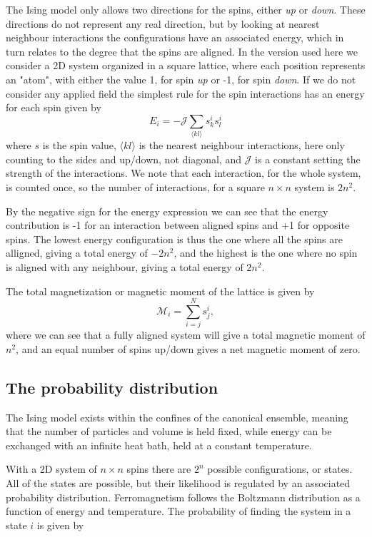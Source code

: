 \documentclass[a4paper]{article}
\begin{document}
The Ising model only allows two directions for the spins, either \textit{up} or \textit{down}. These directions do not represent any real direction, but by looking at nearest neighbour interactions the configurations have an associated energy, which in turn relates to the degree that the spins are aligned. In the version used here we consider a 2D system organized in a square lattice, where each position represents an "atom", with either the value 1, for spin \textit{up} or -1, for spin \textit{down}. If we do not consider any applied field the simplest rule for the spin interactions has an energy for each spin given by 
\begin{equation}
	E_i=-\mathcal{J}\sum_{\langle kl \rangle}s_k^is_l^i \label{eq:E1}
\end{equation}
where $s$ is the spin value, $\langle kl \rangle$ is the nearest neighbour interactions, here only counting to the sides and up/down, not diagonal, and $\mathcal{J}$ is a constant setting the strength of the interactions. We note that each interaction, for the whole system, is counted once, so the number of interactions, for a square $n\times n$ system is $2n^2$.

By the negative sign for the energy expression we can see that the energy contribution is -1 for an interaction between aligned spins and +1 for opposite spins. The lowest energy configuration is thus the one where all the spins are alligned, giving a total energy of $-2n^2$, and the highest is the one where no spin is aligned with any neighbour, giving a total energy of $2n^2$.

The total magnetization or magnetic moment of the lattice is given by
\begin{equation}
	\mathcal{M}_i=\sum_{i=j}^Ns_j^i \label{eq:M},
\end{equation}
where we can see that a fully aligned system will give a total magnetic moment of $n^2$, and an equal number of spins up/down gives a net magnetic moment of zero.


\subsection{The probability distribution}
The Ising model exists within the confines of the canonical ensemble, meaning that the number of particles and volume is held fixed, while energy can be exchanged with an infinite heat bath, held at a constant temperature.

With a 2D system of $n\times n$ spins there are $2^n$ possible configurations, or states. All of the states are possible, but their likelihood is regulated by an associated probability distribution. Ferromagnetism follows the Boltzmann distribution as a function of energy and temperature. The probability of finding the system in a state $i$ is given by
\end{document}
